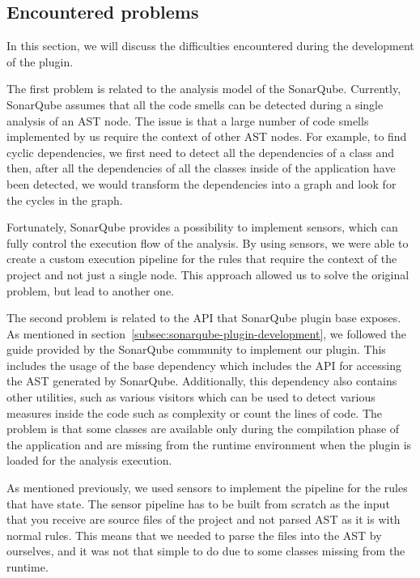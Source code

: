 \subsection{Encountered problems}\label{subsec:encountered-problems}

In this section, we will discuss the difficulties encountered during the development of the plugin.

The first problem is related to the analysis model of the SonarQube.
Currently, SonarQube assumes that all the code smells can be detected during a single
analysis of an AST node.
The issue is that a large number of code smells implemented by us require the context of other AST nodes.
For example, to find cyclic dependencies, we first need to detect all the dependencies
of a class and then, after all the dependencies of all the classes inside of the application have been detected,
we would transform the dependencies into a graph and look for the cycles in the graph.

Fortunately, SonarQube provides a possibility to implement sensors, which can fully control the execution flow
of the analysis.
By using sensors, we were able to create a custom execution pipeline for the rules that require the context of the project
and not just a single node.
This approach allowed us to solve the original problem, but lead to another one.

The second problem is related to the API that SonarQube plugin base exposes.
As mentioned in section~\ref{subsec:sonarqube-plugin-development}, we followed the guide provided by the SonarQube community to implement our plugin.
This includes the usage of the base dependency which includes the API for accessing the AST generated by SonarQube.
Additionally, this dependency also contains other utilities, such as various visitors which can be used to detect
various measures inside the code such as complexity or count the lines of code.
The problem is that some classes are available only during the compilation phase of the application and
are missing from the runtime environment when the plugin is loaded for the analysis execution.

As mentioned previously, we used sensors to implement the pipeline for the rules that have state.
The sensor pipeline has to be built from scratch as the input that you receive are source files of the project and not
parsed AST as it is with normal rules.
This means that we needed to parse the files into the AST by ourselves, and it was not that simple to do due to some
classes missing from the runtime.

